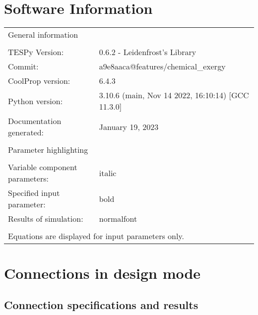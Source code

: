 \documentclass[]{article}
\newcommand{\iftab}{\fontshape{sl}\selectfont}
\newcommand{\bftab}{\fontseries{b}\selectfont}
\begin{document}
\section*{Software Information}

\begin{table}[H]
\begin{tabular}{ll}
\bftab General information&\\
& \\
TESPy Version:&0.6.2 - Leidenfrost's Library\\
Commit:&a9e8aaca@features/chemical\_exergy\\
CoolProp version:&6.4.3\\
Python version:&3.10.6 (main, Nov 14 2022, 16:10:14) [GCC 11.3.0]\\
Documentation generated:&January 19, 2023\\
& \\
\bftab Parameter highlighting&\\
& \\
Variable component parameters:& \iftab italic\\
Specified input parameter:& \bftab bold\\
Results of simulation:& normalfont \\
& \\
\multicolumn{2}{l}{\iftab Equations are displayed for input parameters only.}\\
\end{tabular}
\end{table}
\newpage\section{Connections in design mode}

\subsection{Connection specifications and results}
\end{document}
